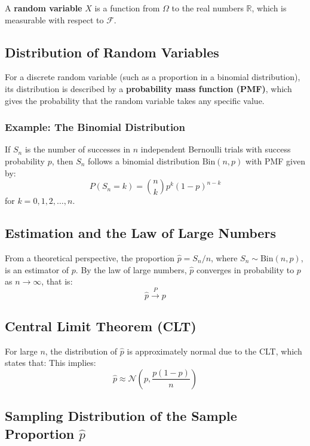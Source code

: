\documentclass[11pt]{article}
\begin{document}
A \textbf{random variable} \( X \) is a function from \( \Omega \) to the real numbers \( \mathbb{R} \), which is measurable with respect to \( \mathcal{F} \).

\subsection*{Distribution of Random Variables}

For a discrete random variable (such as a proportion in a binomial distribution), its distribution is described by a \textbf{probability mass function (PMF)}, which gives the probability that the random variable takes any specific value.

\subsubsection*{Example: The Binomial Distribution}
If \( S_n \) is the number of successes in \( n \) independent Bernoulli trials with success probability \( p \), then \( S_n \) follows a binomial distribution \( \text{Bin}(n, p) \) with PMF given by:
\[
P(S_n = k) = \binom{n}{k} p^k (1-p)^{n-k}
\]
for \( k = 0, 1, 2, \ldots, n \).

\subsection*{Estimation and the Law of Large Numbers}

From a theoretical perspective, the proportion \( \hat{p} = S_n/n \), where \( S_n \sim \text{Bin}(n, p) \), is an estimator of \( p \). By the law of large numbers, \( \hat{p} \) converges in probability to \( p \) as \( n \rightarrow \infty \), that is:
\[
\hat{p} \xrightarrow{P} p
\]

\subsection*{Central Limit Theorem (CLT)}

For large \( n \), the distribution of \( \hat{p} \) is approximately normal due to the CLT, which states that:
This implies:
\[
\hat{p} \approx \mathcal{N}\left(p, \frac{p(1-p)}{n}\right)
\]

\subsection*{Sampling Distribution of the Sample Proportion \( \hat{p} \)}
\end{document}
